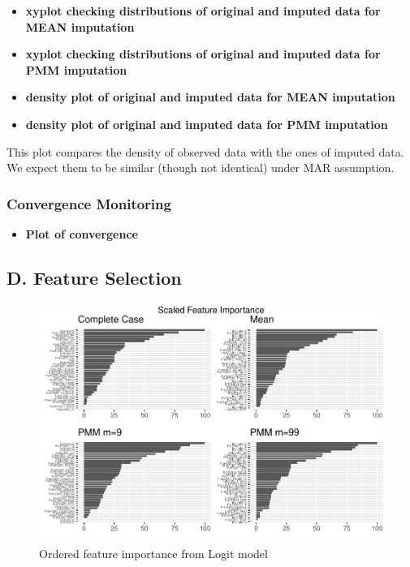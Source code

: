 \documentclass[12pt,]{article}
\providecommand{\tightlist}{%
  \setlength{\itemsep}{0pt}\setlength{\parskip}{0pt}}
\begin{document}
\begin{itemize}
\item
  \textbf{xyplot checking distributions of original and imputed data for
  MEAN imputation}
\item
  \textbf{xyplot checking distributions of original and imputed data for
  PMM imputation}
\item
  \textbf{density plot of original and imputed data for MEAN imputation}
\item
  \textbf{density plot of original and imputed data for PMM imputation}
\end{itemize}

This plot compares the density of observed data with the ones of imputed
data. We expect them to be similar (though not identical) under MAR
assumption.

\subsubsection{Convergence Monitoring}\label{convergence-monitoring}

\begin{itemize}
\tightlist
\item
  \textbf{Plot of convergence}
\end{itemize}

\subsection{D. Feature Selection}\label{d.-feature-selection}

\begin{figure}[H]

{\centering \includegraphics[width=1\linewidth]{figure/graphics-unnamed-chunk-20-1} 

}

\caption{\label{fig:rfe-logit}Ordered feature importance from Logit model}\label{fig:unnamed-chunk-20}
\end{figure}
\end{document}
